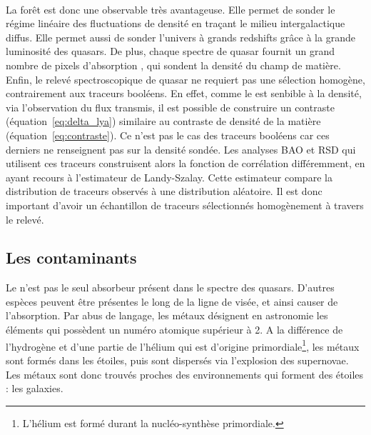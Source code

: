 \paragraph{}
La forêt \lya{} est donc une observable très avantageuse.
Elle permet de sonder le régime linéaire des fluctuations de densité en traçant le milieu intergalactique diffus.
Elle permet aussi de sonder l'univers à grands redshifts grâce à la grande luminosité des quasars. De plus, chaque spectre  de quasar fournit un grand nombre de pixels d'absorption \lya{}, qui sondent la densité du champ de matière.
Enfin, le relevé spectroscopique de quasar \lya{} ne requiert pas une sélection homogène, contrairement aux traceurs booléens.
En effet, comme le \lya{} est senbible à la densité, via l'observation du flux transmis, il est possible de construire un contraste (équation~\ref{eq:delta_lya}) similaire au contraste de densité de la matière (équation~\ref{eq:contraste}). Ce n'est pas le cas des traceurs booléens car ces derniers ne renseignent pas sur la densité sondée. Les analyses BAO et RSD qui utilisent ces traceurs construisent alors la fonction de corrélation différemment, en ayant recours à l'estimateur de Landy-Szalay. Cette estimateur compare la distribution de traceurs observés à une distribution aléatoire.
Il est donc important d'avoir un échantillon de traceurs sélectionnés homogènement à travers le relevé.


\subsection{Les contaminants}
\label{subsec:contaminants}
Le \lya{} n'est pas le seul absorbeur présent dans le spectre des quasars. D'autres espèces peuvent être présentes le long de la ligne de visée, et ainsi causer de l'absorption. Par abus de langage, les métaux désignent en astronomie les éléments qui possèdent un numéro atomique supérieur à 2. A la différence de l'hydrogène et d'une partie de l'hélium qui est d'origine primordiale\footnote{L'hélium est formé durant la nucléo-synthèse primordiale.}, les métaux sont formés dans les étoiles, puis sont dispersés via l'explosion des supernovae. Les métaux sont donc trouvés proches des environnements qui forment des étoiles : les galaxies.

